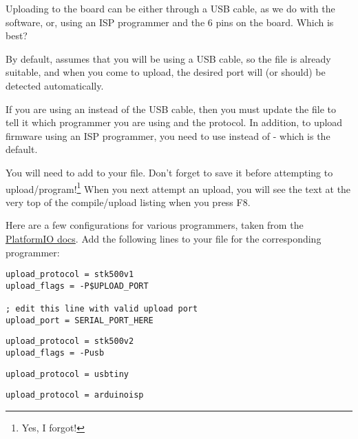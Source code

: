 Uploading to the board can be either through a USB cable, as we do with the   software, or, using an ISP programmer and the 6 pins on the   board. Which is best?

By default,  assumes that you will be using a USB cable, so the file  is already suitable, and when you come to upload, the desired port will (or should) be detected automatically.

If you are using an  instead of the USB cable, then you must update the  file to tell it which programmer you are using and the protocol. In addition, to upload firmware using an ISP programmer, you need to use  instead of  - which is the default. 

You will need to add  to your  file. Don't forget to save it before attempting to upload/program!\footnote{Yes, I forgot!} When you next attempt an upload, you will see the text  at the very top of the compile/upload listing when you press F8.


Here are a few configurations for various programmers, taken from the \href{http://docs.platformio.org/en/latest/platforms/atmelavr.html?highlight=usbtiny#upload-using-programmer}{PlatformIO docs}. Add the following lines to your  file for the corresponding programmer:

\begin{lstlisting}[numbers={none},caption={The \inline{platformio.ini} additions for `AVRISP' ISP Programmer}]
upload_protocol = stk500v1
upload_flags = -P$UPLOAD_PORT

; edit this line with valid upload port
upload_port = SERIAL_PORT_HERE
\end{lstlisting}


\begin{lstlisting}[numbers={none},caption={The \inline{platformio.ini} additions for `AVRISP MkII' Programmer}]
upload_protocol = stk500v2
upload_flags = -Pusb
\end{lstlisting}


\begin{lstlisting}[numbers={none},caption={The \inline{platformio.ini} additions for `USBTinyISP' Programmer}]
upload_protocol = usbtiny
\end{lstlisting}


\begin{lstlisting}[numbers={none},caption={The \inline{platformio.ini} additions for `ArduinoISP` Programmer}]
upload_protocol = arduinoisp
\end{lstlisting}


